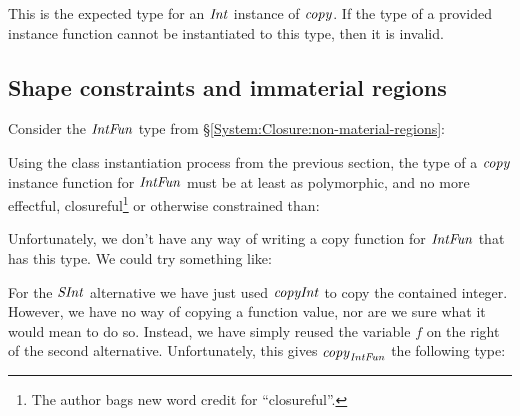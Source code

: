This is the expected type for an $\operatorname{\mathit{Int}}$ instance of $\operatorname{\mathit{copy}}$. If the type of a provided instance function cannot be instantiated to this type, then it is invalid.




\subsection{Shape constraints and immaterial regions}
\label{System:TypeClassing:shape-immaterial}

Consider the $\operatorname{\mathit{IntFun}}$ type from \S\ref{System:Closure:non-material-regions}:


Using the class instantiation process from the previous section, the type of a $\operatorname{\mathit{copy}}$ instance function for $\operatorname{\mathit{IntFun}}$ must be at least as polymorphic, and no more effectful, closureful\footnote{The author bags new word credit for ``closureful''.} or otherwise constrained than:


Unfortunately, we don't have any way of writing a copy function for $\operatorname{\mathit{IntFun}}$ that has this type. We could try something like:


For the $\operatorname{\mathit{SInt}}$ alternative we have just used $\operatorname{\mathit{copyInt}}$ to copy the contained integer. However, we have no way of copying a function value, nor are we sure what it would mean to do so. Instead, we have simply reused the variable $f$ on the right of the second alternative. Unfortunately, this gives $\operatorname{\mathit{copy}}_{\operatorname{\mathit{IntFun}}}$ the following type:

